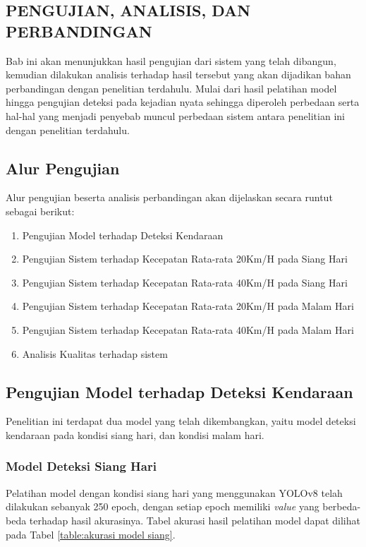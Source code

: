 \begin{spacing}{1.2}
	\chapter{PENGUJIAN, ANALISIS, DAN PERBANDINGAN}
	\label{sec:chap4_analisis}
\end{spacing}

\vspace{4ex}

Bab ini akan menunjukkan hasil pengujian dari sistem yang telah dibangun, kemudian dilakukan analisis terhadap hasil tersebut yang akan dijadikan bahan perbandingan dengan penelitian terdahulu. Mulai dari hasil pelatihan model hingga pengujian deteksi pada kejadian nyata sehingga diperoleh perbedaan serta hal-hal yang menjadi penyebab muncul perbedaan sistem antara penelitian ini dengan penelitian terdahulu.

\section{Alur Pengujian}
Alur pengujian beserta analisis perbandingan akan dijelaskan secara runtut sebagai berikut:

\begin{enumerate}
    \item Pengujian Model terhadap Deteksi Kendaraan
    \item Pengujian Sistem terhadap Kecepatan Rata-rata 20Km/H pada Siang Hari
    \item Pengujian Sistem terhadap Kecepatan Rata-rata 40Km/H pada Siang Hari
    \item Pengujian Sistem terhadap Kecepatan Rata-rata 20Km/H pada Malam Hari
    \item Pengujian Sistem terhadap Kecepatan Rata-rata 40Km/H pada Malam Hari
    \item Analisis Kualitas terhadap sistem
\end{enumerate}

\section{Pengujian Model terhadap Deteksi Kendaraan}
Penelitian ini terdapat dua model yang telah dikembangkan, yaitu model deteksi kendaraan pada kondisi siang hari, dan kondisi malam hari.

\subsection{Model Deteksi Siang Hari}
Pelatihan model dengan kondisi siang hari yang menggunakan YOLOv8 telah dilakukan sebanyak 250 epoch, dengan setiap epoch memiliki \emph{value} yang berbeda-beda terhadap hasil akurasinya. Tabel akurasi hasil pelatihan model dapat dilihat pada Tabel \ref{table:akurasi model siang}.

